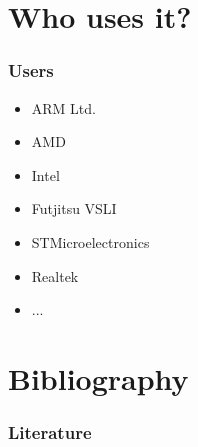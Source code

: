 \documentclass{beamer}
\begin{document}
\section{Who uses it?}
\begin{frame} \frametitle{Users} 
    \begin{itemize}
      \item{ARM Ltd.}
      \item{AMD}
      \item{Intel}
      \item{Futjitsu VSLI}
      \item{STMicroelectronics}
      \item{Realtek}
      \item{...}
    \end{itemize}
\end{frame}
      
\section{Bibliography}
\nocite{haubelt2010digitale}
\nocite{canis2011legup}
\nocite{liao2002system}
\nocite{initiative2014functional}
\begin{frame}[allowframebreaks] \frametitle{Literature} 


\end{frame}
\end{document}
